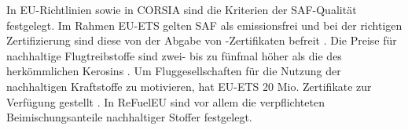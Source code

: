 %
%
%
%
%
%
In EU-Richtlinien sowie in CORSIA sind die Kriterien der SAF-Qualität festgelegt.
Im Rahmen EU-ETS gelten SAF als emissionsfrei und bei der richtigen Zertifizierung 
sind diese von der Abgabe von -Zertifikaten befreit \cite{icao_saf_conversion_2024}. 
Die Preise für nachhaltige Flugtreibstoffe sind zwei- bis zu fünfmal höher 
als die des herkömmlichen Kerosins \cite{iata_saf_2024}. %
Um Fluggesellschaften für die Nutzung der nachhaltigen Kraftstoffe zu motivieren, hat EU-ETS
20 Mio. Zertifikate zur Verfügung gestellt \cite{icao_saf_conversion_2024}. 
In ReFuelEU sind vor allem die verpflichteten Beimischungsanteile nachhaltiger Stoffer festgelegt.


